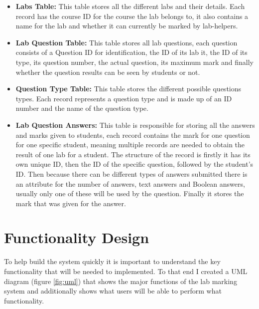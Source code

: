 \documentclass[11pt]{report}
\begin{document}
\begin{itemize}
    \item \textbf{Labs Table:} This table stores all the different labs and their details. Each record has the course ID for the course the lab belongs to, it also contains a name for the lab and whether it can currently be marked by lab-helpers.  
    
    \item \textbf{Lab Question Table:} This table stores all lab questions, each question consists of a Question ID for identification, the ID of its lab it, the ID of its type, its question number, the actual question, its maximum mark  and finally whether the question results can be seen by students or not.
    
    \item \textbf{Question Type Table:} This table stores the different possible questions types. Each record represents a question type and is made up of an ID number and the name of the question type.
    
    \item \textbf{Lab Question Answers:} This table is responsible for storing all the answers and marks given to students, each record contains the mark for one question for one specific student, meaning multiple records are needed to obtain the result of one lab for a student. The structure of the record is firstly it has its own unique ID, then the ID of the specific question, followed by the student's ID. Then because there can be different types of answers submitted there is an attribute for the number of answers, text answers and Boolean answers, usually only one of these will be used by the question. Finally it stores the mark that was given for the answer.
\end{itemize}


\section{Functionality Design}

To help build the system quickly it is important to understand the key functionality that will be needed to implemented. To that end I created a UML diagram (figure \ref{fig:uml}) that shows the major functions of the lab marking system and additionally shows what users will be able to perform what functionality.
\end{document}
